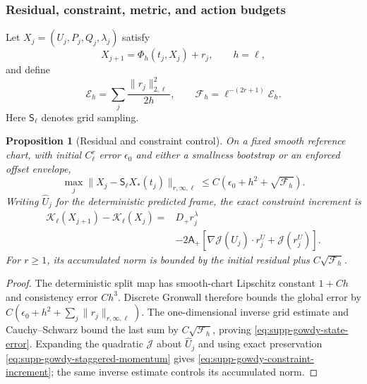 \documentclass[11pt]{article}
\numberwithin{equation}{section}
\newtheorem{proposition}[proposition]{Proposition}
\theoremstyle{definition}
\theoremstyle{remark}
\begin{document}
\subsubsection{Residual, constraint, metric, and action budgets}

Let
$X_j=(U_j,P_j,Q_j,\lambda_j)$ satisfy
\begin{equation}
 X_{j+1}=\Phi_h(t_j,X_j)+r_j,
 \qquad h=\ell,
 \label{eq:supp-gowdy-residual-update}
\end{equation}
and define
\begin{equation}
 \mathcal E_h=\sum_j\frac{\|r_j\|_{2,\ell}^2}{2h},\qquad
 \mathcal F_h=\ell^{-(2r+1)}\mathcal E_h.
 \label{eq:supp-gowdy-residual-energy}
\end{equation}
Here $\mathsf S_\ell$ denotes grid sampling.

\begin{proposition}[Residual and constraint control]
\label{prop:supp-gowdy-residual-control}
On a fixed smooth reference chart, with initial $C^r_\ell$ error $\epsilon_0$
and either a smallness bootstrap or an enforced offset envelope,
\begin{equation}
 \max_j\|X_j-\mathsf S_\ell X_*(t_j)\|_{r,\infty,\ell}
 \le C(\epsilon_0+h^2+\sqrt{\mathcal F_h}).
 \label{eq:supp-gowdy-state-error}
\end{equation}
Writing $\widehat U_j$ for the deterministic predicted frame, the exact
constraint increment is
\begin{align}
 \mathcal K_\ell(X_{j+1})-\mathcal K_\ell(X_j)
 ={}&D_+r_j^\lambda\nonumber\\
 &-2\mathsf A_+
 [\nabla\mathcal J(\widehat U_j)\cdot r_j^U
   +\mathcal J(r_j^U)].
 \label{eq:supp-gowdy-constraint-increment}
\end{align}
For $r\ge1$, its accumulated norm is bounded by the initial residual plus
$C\sqrt{\mathcal F_h}$.
\end{proposition}

\begin{proof}
The deterministic split map has smooth-chart Lipschitz constant $1+Ch$ and
consistency error $Ch^3$.  Discrete Gronwall therefore bounds the global error
by
$C(\epsilon_0+h^2+\sum_j\|r_j\|_{r,\infty,\ell})$.
The one-dimensional inverse grid estimate and Cauchy--Schwarz bound the last
sum by $C\sqrt{\mathcal F_h}$, proving
\eqref{eq:supp-gowdy-state-error}.  Expanding the quadratic $\mathcal J$ about
$\widehat U_j$ and using exact preservation
\eqref{eq:supp-gowdy-staggered-momentum} gives
\eqref{eq:supp-gowdy-constraint-increment}; the same inverse estimate controls
its accumulated norm.
\end{proof}
\end{document}
